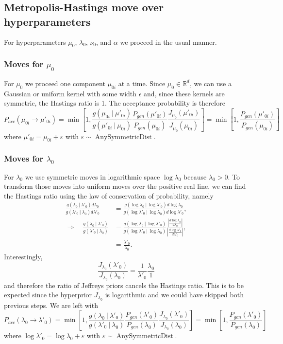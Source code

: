 \documentclass[11pt, oneside]{article}   	%
\begin{document}
\subsection{Metropolis-Hastings move over hyperparameters}
For hyperparameters $\mu_0$, $\lambda_0$, $\nu_0$, and $\alpha$ we proceed in the usual manner. 

\subsubsection{Moves for $\mu_0$}
For $\mu_0$ we proceed one component $\mu_{0i}$ at a time. Since $\mu_0\in\mathbb{R}^d$, we can use a Gaussian or uniform kernel with some width $\epsilon$ and, since these kernels are symmetric, the Hastings ratio is 1. The acceptance probability is therefore
$$P_{acc}(\mu_{0i}\rightarrow\mu'_{0i}) = \min\left[1, \frac{g(\mu_{0i}~\vert~\mu'_{0i})}{g(\mu'_{0i}~\vert~\mu_{0i})}\frac{P_{gen}(\mu'_{0i})}{P_{gen}(\mu_{0i})}\frac{J_{\mu_0}(\mu'_{0i})}{J_{\mu_0}(\mu_{0i})}\right] =  \min\left[1, \frac{P_{gen}(\mu'_{0i})}{P_{gen}(\mu_{0i})}\right]$$
where $\mu'_{0i} = \mu_{0i} + \varepsilon$ with $\varepsilon \sim\operatorname{AnySymmetricDist}$.

\subsubsection{Moves for $\lambda_0$}
For $\lambda_0$ we use symmetric moves in logarithmic space $\log\lambda_0$ because $\lambda_0 > 0$. To transform those moves into uniform moves over the positive real line, we can find the Hastings ratio using the law of conservation of probability, namely
\begin{equation}\begin{split}
\frac{g(\lambda_0~\vert~\lambda'_0) d\lambda_0}{g(\lambda'_0~\vert~\lambda_0)d\lambda'_0} &= \frac{g(\log\lambda_0~\vert~\log\lambda'_0) d\log\lambda_0}{g(\log\lambda'_0~\vert~\log\lambda_0)d\log\lambda'_0},\\
\Rightarrow\quad\frac{g(\lambda_0~\vert~\lambda'_0)}{g(\lambda'_0~\vert~\lambda_0)} &= \frac{g(\log\lambda_0~\vert~\log\lambda'_0)}{g(\log\lambda'_0~\vert~\log\lambda_0)} \frac{\left\vert\frac{d\log\lambda_0}{d\lambda_0}\right\vert}{\left\vert\frac{d\log\lambda'_0}{d\lambda'_0}\right\vert},\\
&= \frac{\lambda'_0}{\lambda_0}.
\end{split}\end{equation}
Interestingly,
$$\frac{J_{\lambda_0}(\lambda'_0)}{J_{\lambda_0}(\lambda_0)} = \frac{1}{\lambda'_0}\frac{\lambda_0}{1}$$
and therefore the ratio of Jeffreys priors cancels the Hastings ratio. This is to be expected since the hyperprior $J_{\lambda_0}$ is logarithmic and we could have skipped both previous steps. We are left with
$$P_{acc}(\lambda_0\rightarrow\lambda'_0) = \min\left[1, \frac{g(\lambda_{0}~\vert~\lambda'_{0})}{g(\lambda'_{0}~\vert~\lambda_{0})}\frac{P_{gen}(\lambda'_{0})}{P_{gen}(\lambda_{0})}\frac{J_{\lambda_0}(\lambda'_{0})}{J_{\lambda_0}(\lambda_{0})}\right] =  \min\left[1, \frac{P_{gen}(\lambda'_{0})}{P_{gen}(\lambda_{0})}\right]$$
where $\log\lambda'_0 = \log\lambda_0 + \varepsilon$ with $\varepsilon \sim\operatorname{AnySymmetricDist}$.
\end{document}
